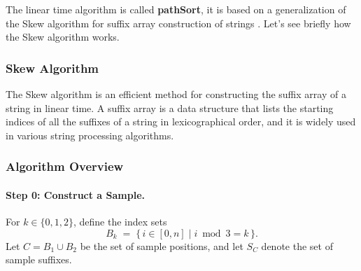The linear time algorithm is called \textbf{pathSort}, it is based on a generalization of the Skew algorithm for suffix array construction of strings \cite{karkkainen2006linear}. Let's see briefly how the Skew algorithm works.

\subsubsection{Skew Algorithm}
The Skew algorithm is an efficient method for constructing the suffix array of a string in linear time. A suffix array is a data structure that lists the starting indices of all the suffixes of a string in lexicographical order, and it is widely used in various string processing algorithms.

\subsubsection*{Algorithm Overview}

\paragraph{Step 0: Construct a Sample.}
For $k \in \{0,1,2\}$, define the index sets
\[
B_k \;=\; \{\, i \in [0,n] \mid i \bmod 3 = k \,\}.
\]
Let $C = B_1 \cup B_2$ be the set of sample positions, and let $S_C$ denote the set of sample suffixes.

